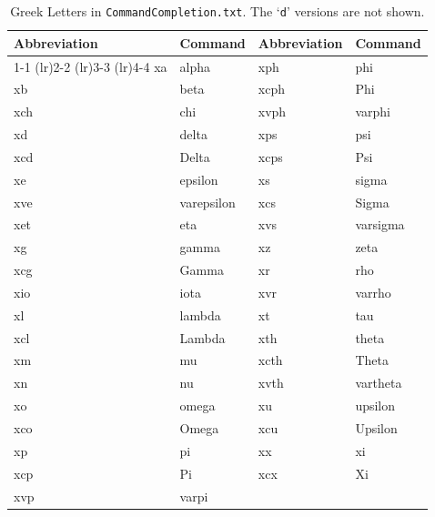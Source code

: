\documentclass[11pt]{article}
\newcommand{\CCT}{\texttt{CommandCompletion.txt}}
\begin{document}
\begin{table}[!h]
\small
\centering
\caption{Greek Letters in \CCT. The `\texttt{d}' versions are not shown.}
\label{tbl:greek}
\vspace{10pt}
\begin{tabular}{llll}
\textbf{Abbreviation} & \textbf{Command} & \textbf{Abbreviation} & \textbf{Command} \\
\cmidrule[0.5pt](lr){1-1} \cmidrule[0.5pt](lr){2-2} \cmidrule[0.5pt](lr){3-3} \cmidrule[0.5pt](lr){4-4}
xa  & alpha      & xph  & phi \\
xb  & beta       & xcph & Phi \\
xch & chi        & xvph & varphi \\
xd  & delta      & xps  & psi \\
xcd & Delta      & xcps & Psi \\
xe  & epsilon    & xs   & sigma \\
xve & varepsilon & xcs  & Sigma \\
xet & eta        & xvs  & varsigma \\
xg  & gamma      & xz   & zeta \\
xcg & Gamma      & xr   & rho \\
xio & iota       & xvr  & varrho \\
xl  & lambda     & xt   & tau \\
xcl & Lambda     & xth  & theta \\
xm  & mu         & xcth & Theta \\
xn  & nu         & xvth & vartheta \\
xo  & omega      & xu   & upsilon \\
xco & Omega      & xcu  & Upsilon \\
xp  & pi         & xx   & xi \\
xcp & Pi         & xcx  & Xi \\
xvp & varpi      &      & \\
\end{tabular}
\end{table}
\end{document}
